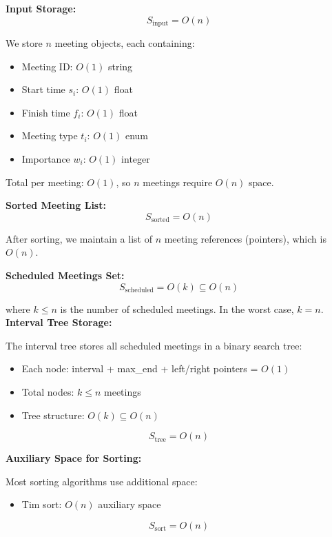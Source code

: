 \documentclass[conference]{IEEEtran}
\begin{document}
\textbf{Input Storage:}
\begin{equation}
S_{\text{input}} = O(n)
\end{equation}

We store $n$ meeting objects, each containing:
\begin{itemize}
    \item Meeting ID: $O(1)$ string
    \item Start time $s_i$: $O(1)$ float
    \item Finish time $f_i$: $O(1)$ float
    \item Meeting type $t_i$: $O(1)$ enum
    \item Importance $w_i$: $O(1)$ integer
\end{itemize}

Total per meeting: $O(1)$, so $n$ meetings require $O(n)$ space.

\textbf{Sorted Meeting List:}
\begin{equation}
S_{\text{sorted}} = O(n)
\end{equation}

After sorting, we maintain a list of $n$ meeting references (pointers), which is $O(n)$.

\textbf{Scheduled Meetings Set:}
\begin{equation}
S_{\text{scheduled}} = O(k) \subseteq O(n)
\end{equation}

where $k \leq n$ is the number of scheduled meetings. In the worst case, $k = n$.
\newline
\newline
\textbf{Interval Tree Storage:}

The interval tree stores all scheduled meetings in a binary search tree:
\begin{itemize}
    \item Each node: interval + max\_end + left/right pointers = $O(1)$
    \item Total nodes: $k \leq n$ meetings
    \item Tree structure: $O(k) \subseteq O(n)$
\end{itemize}

\begin{equation}
S_{\text{tree}} = O(n)
\end{equation}

\textbf{Auxiliary Space for Sorting:}

Most sorting algorithms use additional space:
\begin{itemize}
    \item Tim sort: $O(n)$ auxiliary space
\end{itemize}
\begin{equation}
S_{\text{sort}} = O(n)
\end{equation}
\end{document}
